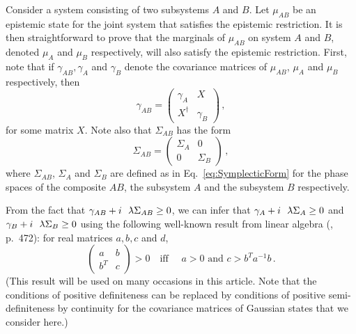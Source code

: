 \documentclass[pra,superscriptaddress,nofootinbib,12pt]{revtex4-2}
\begin{document}
Consider a system consisting of two subsystems $A$ and $B$. Let $\mu_{AB}$ be an epistemic state for the joint system that satisfies the epistemic restriction.  It is then straightforward to prove that the marginals of $\mu_{AB}$ on system $A$ and $B$, denoted $\mu_A$ and $\mu_B$ respectively, will also satisfy the epistemic restriction.  First, note that if $\gamma_{AB}, \gamma_A$ and $\gamma_B$ denote the covariance matrices of $\mu_{AB}$, $\mu_{A}$ and $\mu_{B}$ respectively, then
\begin{equation}
\gamma_{AB} =
\begin{pmatrix}
\gamma_A & X \\
X^{\dag } & \gamma_B
\end{pmatrix}
\,,  \label{gammablock}
\end{equation}
for some matrix $X$.  Note also that $\Sigma_{AB}$ has the form
\begin{equation}
\Sigma_{AB} =
\begin{pmatrix}
\Sigma_A & 0 \\
0 & \Sigma_B
\end{pmatrix}
\,,  \label{sigmablock}
\end{equation}
where $\Sigma_{AB}$, $\Sigma_A$ and $\Sigma_B$ are defined as in Eq.~\eqref{eq:SymplecticForm} for the phase spaces of the composite $AB$, the subsystem $A$ and the subsystem $B$ respectively.

From the fact that $\gamma_{AB} + i\lambdabar \Sigma_{AB} \geq 0$, we can infer that $\gamma_A + i\lambdabar \Sigma_A \geq 0$ and $\gamma_B + i\lambdabar \Sigma_B \geq 0$ using the following well-known result from linear algebra (\cite{HorneJohnson}, p.~472): for real matrices $a,b,c$ and $d$,
\begin{equation} \label{eq:partitionedmatrix}
\begin{pmatrix}
a & b \\
b^{T} & c
\end{pmatrix}
> 0 \quad \text{iff }\quad a > 0 \text{ and } c > b^{T}a^{-1}b \,.
\end{equation}
(This result will be used on many occasions in this article. Note that the conditions of positive definiteness can be replaced by conditions of positive semi-definiteness by continuity for the covariance matrices of Gaussian states that we consider here.)
\end{document}
